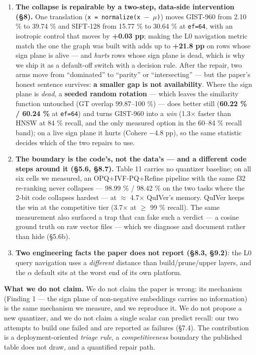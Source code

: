 \documentclass[
  10pt,
]{article}
\begin{document}
\begin{enumerate}
  arms --- including a \textbf{6/6 prospective hold-out} frozen before
  those six arms were measured (§7.3).
\item
  \textbf{The collapse is repairable by a two-step, data-side
  intervention (§8).} One translation
  (\texttt{x\textquotesingle{}\ =\ normalize(x\ $-$\ $\mu$)}) moves GIST-960
  from 2.10 \% to 39.74 \% and SIFT-128 from 15.77 \% to 30.64 \% at
  \texttt{ef=64}, with an isotropic control that moves by \textbf{+0.03
  pp}; making the L0 navigation metric match the one the graph was built
  with adds up to \textbf{+21.8 pp} on rows whose sign plane is alive
  --- and \emph{hurts} rows whose sign plane is dead, which is why we
  ship it as a default-off switch with a decision rule. After the
  repair, two arms move from ``dominated'' to ``parity'' or
  ``intersecting'' --- but the paper's honest sentence survives:
  \textbf{a smaller gap is not availability}. Where the sign plane is
  \emph{dead}, a \textbf{seeded random rotation} --- which leaves the
  similarity function untouched (GT overlap 99.87--100 \%) --- does
  better still (\textbf{60.22 \% / 60.24 \%} at \texttt{ef=64}) and
  turns GIST-960 into a \emph{win} (1.3$\times$ faster than HNSW at 84 \%
  recall, and the only measured option in the 60--84 \% recall band); on
  a live sign plane it hurts (Cohere $-$4.8 pp), so the same statistic
  decides which of the two repairs to use.
\item
  \textbf{The boundary is the code's, not the data's --- and a different
  code steps around it (§5.6, §8.7).} Table 11 carries no quantizer
  baseline; on all six cells we measured, an OPQ+IVF-PQ+Refine pipeline
  with the same f32 re-ranking never collapses --- 98.99 \% / 98.42 \%
  on the two tasks where the 2-bit code collapses hardest --- at $\approx$ 4.7$\times$
  QuIVer's memory. QuIVer keeps the win at the competitive tier (3.7$\times$ at
  $\geq$ 99 \% recall). The same measurement also surfaced a trap that can
  fake such a verdict --- a cosine ground truth on raw vector files ---
  which we diagnose and document rather than hide (§5.6b).
\item
  \textbf{Two engineering facts the paper does not report (§8.3, §9.2)}:
  the L0 query navigation uses a \emph{different} distance than
  build/prune/upper layers, and the \texttt{$\alpha$} default sits at the worst
  end of its own platform.
\end{enumerate}

\textbf{What we do not claim.} We do not claim the paper is wrong: its
mechanism (Finding 1 --- the sign plane of non-negative embeddings
carries no information) is the same mechanism we measure, and we
reproduce it. We do not propose a new quantizer, and we do not claim a
single scalar can predict recall: our two attempts to build one failed
and are reported as failures (§7.4). The contribution is a
deployment-oriented \emph{triage rule}, a \emph{competitiveness}
boundary the published table does not draw, and a quantified repair
path.
\end{document}
